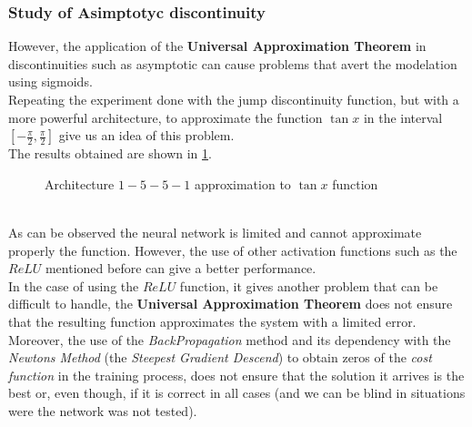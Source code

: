 \documentclass[a4paper, 11pt]{article}
\begin{document}
\subsubsection{Study of Asimptotyc discontinuity}
However, the application of the \textbf{Universal Approximation Theorem} in discontinuities such as asymptotic can cause problems that avert the modelation using sigmoids.\\
Repeating the experiment done with the jump discontinuity function, but with a more powerful architecture, to approximate the function $\tan{x}$ in the interval $[-\frac{\pi}{2},\frac{\pi}{2}]$ give us an idea of this problem.\\
The results obtained are shown in \ref{asymp}.
\begin{figure}[h]
    \centering
    \caption{Architecture $1-5-5-1$ approximation to $\tan{x}$ function}
    \label{asymp}
\end{figure}\\
\newpage
\hspace{-1.6em}As can be observed the neural network is limited and cannot approximate properly the function. However, the use of other activation functions such as the $ReLU$ mentioned before can give a better performance.\\
In the case of using the $ReLU$ function, it gives another problem that can be difficult to handle, the \textbf{Universal Approximation Theorem} does not ensure that the resulting function approximates the system with a limited error.\\
Moreover, the use of the \textit{BackPropagation} method and its dependency with the \textit{Newtons Method} (the \textit{Steepest Gradient Descend}) to obtain zeros of the \textit{cost function} in the training process, does not ensure that the solution it arrives is the best or, even though, if it is correct in all cases (and we can be blind in situations were the network was not tested).\\
\end{document}
